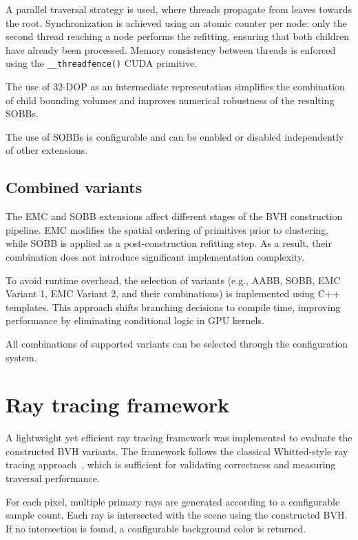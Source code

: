 A parallel traversal strategy is used, where threads propagate from leaves towards the root. Synchronization is achieved using an atomic counter per node: only the second thread reaching a node performs the refitting, ensuring that both children have already been processed. Memory consistency between threads is enforced using the \texttt{\_\_threadfence()} CUDA primitive.

The use of 32-DOP as an intermediate representation simplifies the combination of child bounding volumes and improves numerical robustness of the resulting SOBBs.

The use of SOBBs is configurable and can be enabled or disabled independently of other extensions.

\subsection{Combined variants}

The EMC and SOBB extensions affect different stages of the BVH construction pipeline. EMC modifies the spatial ordering of primitives prior to clustering, while SOBB is applied as a post-construction refitting step. As a result, their combination does not introduce significant implementation complexity.

To avoid runtime overhead, the selection of variants (e.g., AABB, SOBB, EMC Variant 1, EMC Variant 2, and their combinations) is implemented using C++ templates. This approach shifts branching decisions to compile time, improving performance by eliminating conditional logic in GPU kernels.

All combinations of supported variants can be selected through the configuration system.

\section{Ray tracing framework}

A lightweight yet efficient ray tracing framework was implemented to evaluate the constructed BVH variants. The framework follows the classical Whitted-style ray tracing approach~\cite{W80}, which is sufficient for validating correctness and measuring traversal performance.

For each pixel, multiple primary rays are generated according to a configurable sample count. Each ray is intersected with the scene using the constructed BVH. If no intersection is found, a configurable background color is returned.

